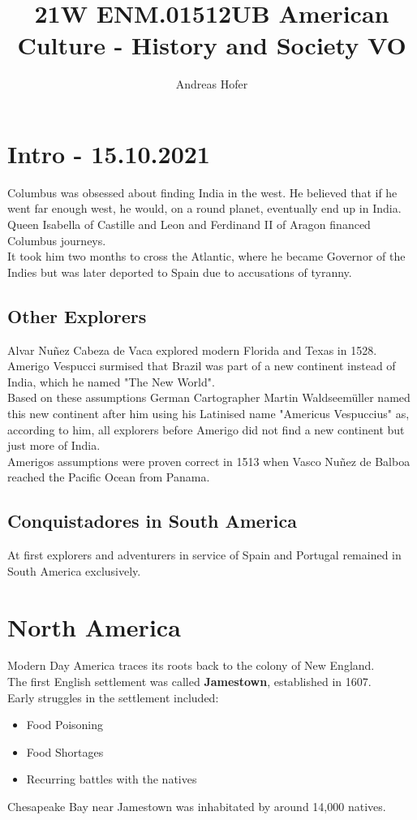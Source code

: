 \documentclass{article}
\title{21W ENM.01512UB American Culture - History and Society VO}
\author{Andreas Hofer}
\begin{document}
	\maketitle
	\section{Intro - 15.10.2021}
	Columbus was obsessed about finding India in the west. He believed that if he went far enough west, he would, on a round planet, eventually end up in India.\\
	Queen Isabella of Castille and Leon and Ferdinand II of Aragon financed Columbus journeys. \\
	It took him two months to cross the Atlantic, where he became Governor of the Indies but was later deported to Spain due to accusations of tyranny. \\
	\subsection{Other Explorers}
	Alvar Nuñez Cabeza de Vaca explored modern Florida and Texas in 1528. \\
	Amerigo Vespucci surmised that Brazil was part of a new continent instead of India, which he named "The New World". \\
	Based on these assumptions German Cartographer Martin Waldseemüller named this new continent after him using his Latinised name "Americus Vespuccius" as, according to him, all explorers before Amerigo did not find a new continent but just more of India. \\
	Amerigos assumptions were proven correct in 1513 when Vasco Nuñez de Balboa reached the Pacific Ocean from Panama. \\
	\subsection{Conquistadores in South America}
	At first explorers and adventurers in service of Spain and Portugal remained in South America exclusively. \\
	\section{North America}
	Modern Day America traces its roots back to the colony of New England. \\
	The first English settlement was called \textbf{Jamestown}, established in 1607. \\
	Early struggles in the settlement included: \\
	\begin{itemize}
		\item{Food Poisoning}
		\item{Food Shortages}
		\item{Recurring battles with the natives}
	\end{itemize}
	Chesapeake Bay near Jamestown was inhabitated by around 14,000 natives. \\
\end{document}
